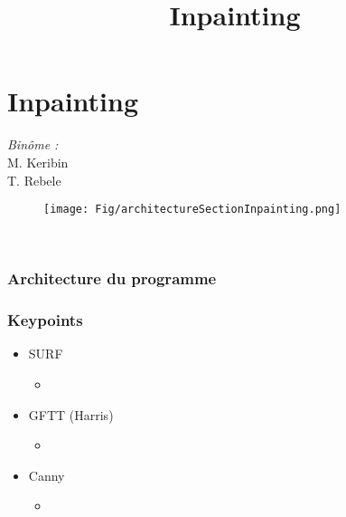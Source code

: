  \section{Inpainting}
 \begin{frame}
 \title{Inpainting}
 \titlepage

    \begin{minipage}{0.3\textwidth}
    \begin{flushleft} \large
    \emph{Binôme :}\\
    M. Keribin\\
    T. Rebele
    \end{flushleft}
    \end{minipage}
    \begin{minipage}{0.5\textwidth}
    \begin{flushright} \large
    \begin{figure}
    \texttt{[image: Fig/architectureSectionInpainting.png]}
    \end{figure}
    \end{flushright}
    \end{minipage}\\[3cm]
    
 \end{frame}



\begin{frame}
  \frametitle{Architecture du programme}

\end{frame}



\begin{frame}
  \frametitle{Keypoints}
  
  \begin{itemize}
  \item SURF
  	\begin{itemize}
  	\item
  	\end{itemize}
  	
  \item GFTT (Harris)
	\begin{itemize}
  	\item
  	\end{itemize}
  	
  \item Canny
    \begin{itemize}
  	\item
  	\end{itemize}
  	
  \end{itemize}


\end{frame}



